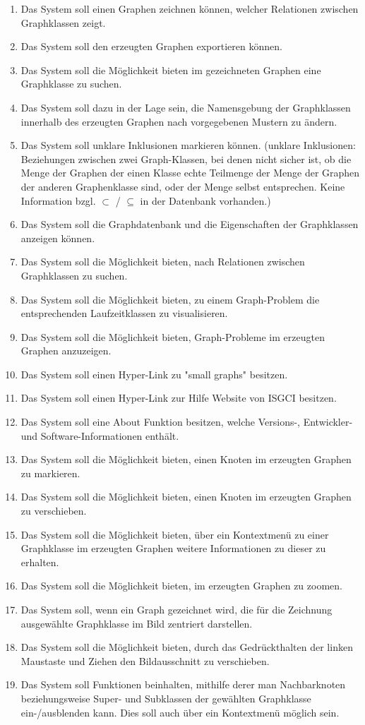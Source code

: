 \documentclass[11pt,a4paper]{article}
\begin{document}
	\begin{enumerate}[leftmargin=.9cm]
\item Das System soll einen Graphen zeichnen können, welcher Relationen zwischen Graphklassen zeigt.
\item Das System soll den erzeugten Graphen exportieren können.
\item Das System soll die Möglichkeit bieten im gezeichneten Graphen eine Graphklasse zu suchen. 
\item Das System soll dazu in der Lage sein, die Namensgebung der Graphklassen innerhalb des erzeugten Graphen nach vorgegebenen Mustern zu ändern.
\item Das System soll unklare Inklusionen markieren können. (unklare Inklusionen: Beziehungen zwischen zwei Graph-Klassen, bei denen nicht sicher ist, ob die Menge der Graphen der einen Klasse echte Teilmenge der Menge der Graphen der anderen Graphenklasse sind, oder der Menge selbst entsprechen. Keine Information bzgl. $\subset$ / $\subseteq$ in der Datenbank vorhanden.)
\item Das System soll die Graphdatenbank und die Eigenschaften der Graphklassen anzeigen können. 
\item Das System soll die Möglichkeit bieten, nach Relationen zwischen Graphklassen zu suchen.
\item Das System soll die Möglichkeit bieten, zu einem Graph-Problem die entsprechenden Laufzeitklassen zu visualisieren.
\item Das System soll die Möglichkeit bieten, Graph-Probleme im erzeugten Graphen anzuzeigen.
\item Das System soll einen Hyper-Link zu "small graphs" besitzen.
\item Das System soll einen Hyper-Link zur Hilfe Website von ISGCI besitzen.
\item Das System soll eine About Funktion besitzen, welche Versions-, Entwickler- und Software-Informationen enthält.
\item Das System soll die Möglichkeit bieten, einen Knoten im erzeugten Graphen zu markieren.
\item Das System soll die Möglichkeit bieten, einen Knoten im erzeugten Graphen zu verschieben.
\item Das System soll die Möglichkeit bieten, über ein Kontextmenü zu einer Graphklasse im erzeugten Graphen weitere Informationen zu dieser zu erhalten.
\item Das System soll die Möglichkeit bieten, im erzeugten Graphen zu zoomen.
\item Das System soll, wenn ein Graph gezeichnet wird, die für die Zeichnung ausgewählte Graphklasse im Bild zentriert darstellen.
\item Das System soll die Möglichkeit bieten, durch das Gedrückthalten der linken Maustaste und Ziehen den Bildausschnitt zu verschieben.
\item Das System soll Funktionen beinhalten, mithilfe derer man Nachbarknoten beziehungsweise Super- und Subklassen der gewählten Graphklasse ein-/ausblenden kann. Dies soll auch über ein Kontextmenü möglich sein.



\end{enumerate}
\end{document}
